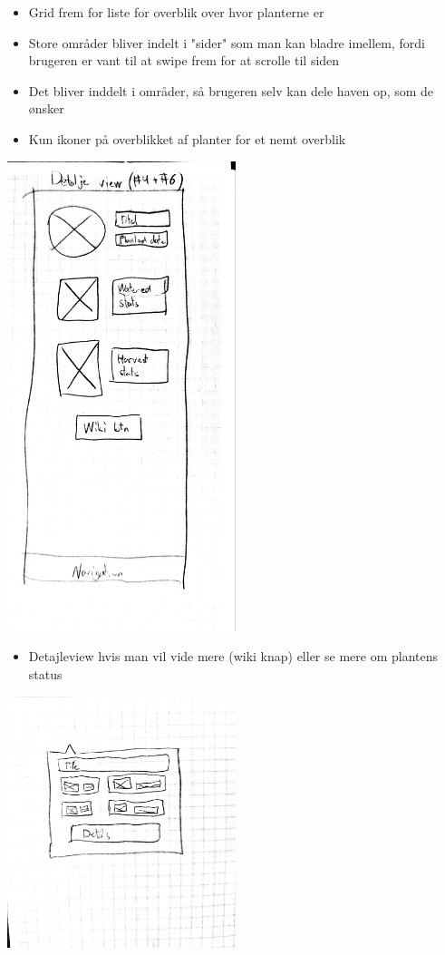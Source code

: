 \begin{itemize}
    \item Grid frem for liste for overblik over hvor planterne er
    \item Store områder bliver indelt i "sider" som man kan bladre imellem, fordi brugeren er vant til at swipe frem for at scrolle til siden
    \item Det bliver inddelt i områder, så brugeren selv kan dele haven op, som de ønsker
    \item Kun ikoner på overblikket af planter for et nemt overblik
\end{itemize}

\includegraphics[width=0.5\textwidth]{img/s1-2.jpg}\\

\begin{itemize}
    \item Detajleview hvis man vil vide mere (wiki knap) eller se mere om plantens status
\end{itemize}

\includegraphics[width=0.5\textwidth]{img/s1-6.jpg}\\

